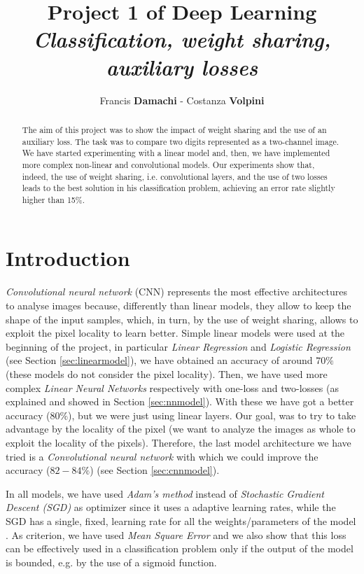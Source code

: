 \documentclass[journal, a4paper]{IEEEtran}
\begin{document}
	\title{Project 1 of Deep Learning\\ \textit{\Large{Classification, weight sharing, auxiliary losses}}}
	\author{Francis \textbf{Damachi} - Costanza \textbf{Volpini}}
	\maketitle
	
\begin{abstract}
The aim of this project was to show the impact of weight sharing and the use of an auxiliary loss. The task was to compare two digits represented as a two-channel image. We have started experimenting with a linear model and, then, we have implemented more complex non-linear and convolutional models. Our experiments show that, indeed, the use of weight sharing, i.e. convolutional layers, and the use of two losses leads to the best solution in his classification problem, achieving an error rate slightly higher than 15\%.
\end{abstract}

\section{Introduction}
\label{sec:intro}
\textit{Convolutional neural network} (CNN) represents the most effective architectures to analyse images because, differently than linear models, they allow to keep the shape of the input samples, which, in turn, by the use of weight sharing, allows to exploit the pixel locality to learn better.
Simple linear models were used at the beginning of the project, in particular \textit{Linear Regression} and \textit{Logistic Regression} (see Section \ref{sec:linearmodel}), we have obtained an accuracy of around $70\%$ (these models do not consider the pixel locality). Then, we have used more complex \textit{Linear Neural Networks} respectively with one-loss and two-losses (as explained and showed in Section \ref{sec:nnmodel}). With these we have got a better accuracy ($80\%$), but we were just using linear layers. Our goal, was to try to take advantage by the locality of the pixel (we want to analyze the images as whole to exploit the locality of the pixels). Therefore, the last model architecture we have tried is a \textit{Convolutional neural network} with which we could improve the accuracy ($82-84\%$) (see Section \ref{sec:cnnmodel}).

In all models, we have used \textit{Adam's method} instead of \textit{Stochastic Gradient Descent (SGD)} as optimizer since it uses a adaptive learning rates, while the SGD has a single, fixed, learning rate for all the weights/parameters of the model \cite{reference0}.
As criterion, we have used \textit{Mean Square Error} and we also show that this loss can be effectively used in a classification problem only if the output of the model is bounded, e.g. by the use of a sigmoid function.
\end{document}
